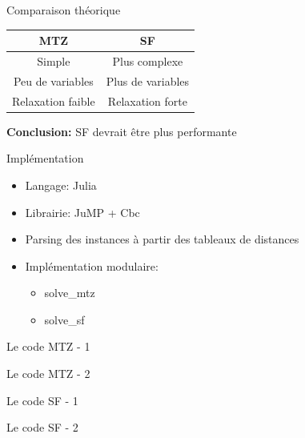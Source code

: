 \documentclass{beamer}
\begin{document}
\begin{frame}{Comparaison théorique}
\begin{center}
\begin{tabular}{c|c}
MTZ & SF \\
\hline
Simple & Plus complexe \\
Peu de variables & Plus de variables \\
Relaxation faible & Relaxation forte \\
\end{tabular}
\end{center}

\bigskip

\textbf{Conclusion:} SF devrait être plus performante
\end{frame}

\begin{frame}{Implémentation}
\begin{itemize}
    \item Langage: Julia
    \item Librairie: JuMP + Cbc
    \item Parsing des instances à partir des tableaux de distances
    \item Implémentation modulaire:
    \begin{itemize}
        \item solve\_mtz
        \item solve\_sf
    \end{itemize}
\end{itemize}
\end{frame}

\begin{frame}{Le code MTZ - 1}
\end{frame}

\begin{frame}{Le code MTZ - 2}
\end{frame}

\begin{frame}{Le code SF - 1}
\end{frame}

\begin{frame}{Le code SF - 2}
\end{frame}
\end{document}
